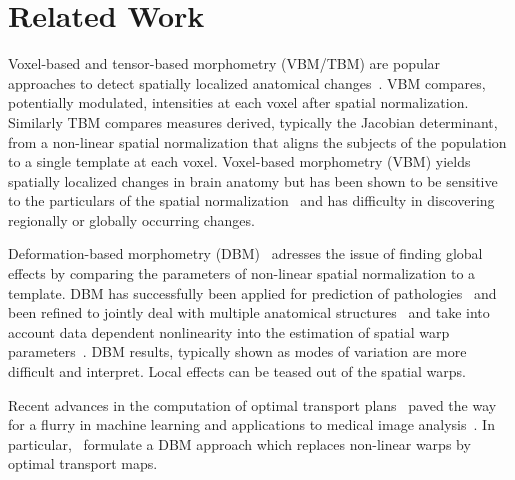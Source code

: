 \documentclass{llncs}
\begin{document}
\section{Related Work}


Voxel-based and tensor-based morphometry (VBM/TBM) are popular approaches to
detect spatially localized anatomical changes~\citep{ashburner2000voxel}. VBM
compares, potentially modulated, intensities at each voxel after
spatial normalization. Similarly TBM compares measures derived, typically the
Jacobian determinant, from a non-linear spatial normalization that aligns the
subjects of the population to a single template at each voxel. 
Voxel-based
morphometry (VBM) yields spatially localized changes in brain anatomy but has
been shown to be sensitive to the particulars of the spatial
normalization~\citep{bookstein2001voxel, davatzikos2004voxel} and has
difficulty in discovering regionally or globally occurring changes. 

Deformation-based morphometry (DBM)~\citep{ashburner1998identifying} adresses
the issue of finding global effects by comparing the parameters of non-linear
spatial normalization to a template.  DBM has successfully been applied for
prediction of pathologies~\citep{gaser2001deformation,lao2004morphological} and been refined to
jointly deal with multiple anatomical
structures~\cite{durrleman2014morphometry} and take into account data dependent
nonlinearity into the estimation of spatial warp
parameters~\citep{gerber2010manifold}. DBM results, typically shown as modes of
variation are more difficult and interpret. Local effects can be teased out of
the spatial warps.

Recent advances in the computation of optimal transport
plans~\citep{cuturi2013sinkhorn,gerber2017multiscale} paved the way for a
flurry in machine learning and applications to medical image
analysis~\citep{cuturi2014fast,gramfort2015fast,rolet2018blind}. In
particular,~\citet{gramfort2015fast} formulate a DBM approach which replaces
non-linear warps by optimal transport maps. 
\end{document}

